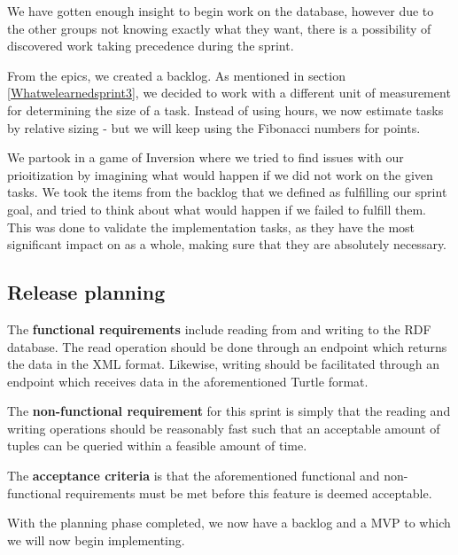We have gotten enough insight to begin work on the database, however due to the other groups not knowing exactly what they want, there is a possibility of discovered work taking precedence during the sprint.

From the epics, we created a backlog. As mentioned in section \ref{Whatwelearnedsprint3}, we decided to work with a different unit of measurement for determining the size of a task.
Instead of using hours, we now estimate tasks by relative sizing - but we will keep using the Fibonacci numbers for points.

We partook in a game of Inversion \cite{InversionThinking} where we tried to find issues with our prioitization by imagining what would happen if we did not work on the given tasks.
We took the items from the backlog that we defined as fulfilling our sprint goal, and tried to think about what would happen if we failed to fulfill them. 
This was done to validate the implementation tasks, as they have the most significant impact on \knox{} as a whole, making sure that they are absolutely necessary. 

\subsection*{Release planning}
The \textbf{functional requirements} include reading from and writing to the RDF database. 
The read operation should be done through an endpoint which returns the data in the XML format.
Likewise, writing should be facilitated through an endpoint which receives data in the aforementioned Turtle format.


The \textbf{non-functional requirement} for this sprint is simply that the reading and writing operations should be reasonably fast such that an acceptable amount of tuples can be queried within a feasible amount of time.


The \textbf{acceptance criteria} is that the aforementioned functional and non-functional requirements must be met before this feature is deemed acceptable. 


With the planning phase completed, we now have a backlog and a MVP to which we will now begin implementing.